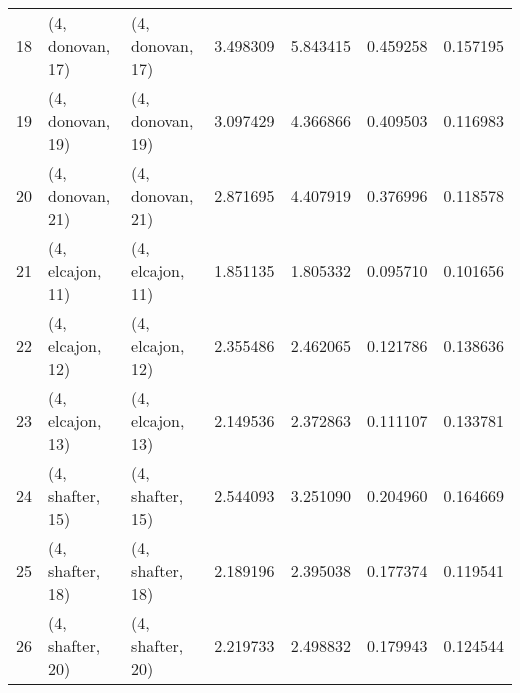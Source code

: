 \begin{tabular}{lllrrrr}
18 &  (4, donovan, 17) &  (4, donovan, 17) &  3.498309 &  5.843415 &   0.459258 &  0.157195 \\
19 &  (4, donovan, 19) &  (4, donovan, 19) &  3.097429 &  4.366866 &   0.409503 &  0.116983 \\
20 &  (4, donovan, 21) &  (4, donovan, 21) &  2.871695 &  4.407919 &   0.376996 &  0.118578 \\
21 &  (4, elcajon, 11) &  (4, elcajon, 11) &  1.851135 &  1.805332 &   0.095710 &  0.101656 \\
22 &  (4, elcajon, 12) &  (4, elcajon, 12) &  2.355486 &  2.462065 &   0.121786 &  0.138636 \\
23 &  (4, elcajon, 13) &  (4, elcajon, 13) &  2.149536 &  2.372863 &   0.111107 &  0.133781 \\
24 &  (4, shafter, 15) &  (4, shafter, 15) &  2.544093 &  3.251090 &   0.204960 &  0.164669 \\
25 &  (4, shafter, 18) &  (4, shafter, 18) &  2.189196 &  2.395038 &   0.177374 &  0.119541 \\
26 &  (4, shafter, 20) &  (4, shafter, 20) &  2.219733 &  2.498832 &   0.179943 &  0.124544 \\
\bottomrule
\end{tabular}
